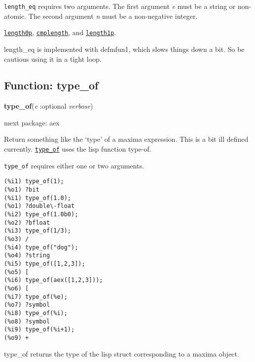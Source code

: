 \documentclass[]{article}
\begin{document}
\vspace{5 pt}

   {\tt length\_eq} requires two arguments.
    The first argument {\it e} must be a string or non-atomic.
    The second argument {\it n} must be a non-negative integer.


\vspace{5 pt}


  \hyperlink{length0p}{{\tt length0p}}, \hyperlink{cmplength}{{\tt cmplength}}, and \hyperlink{length1p}{{\tt length1p}}.

\vspace{5 pt}


length\_eq is implemented with defmfun1, which slows things down a bit. So be cautious using it in a tight loop. 

\vspace{5 pt}


\subsection{Function: type\_of\label{sec:type_of}}
\hypertarget{type_of}{}
{\bf type\_of}({\it e} :optional {\it verbose})


\noindent mext package: aex



\vspace{5 pt}
Return something like the `type' of a maxima expression. This is a bit ill defined currently. \hyperlink{type_of}{{\tt type\_of}} uses the lisp function type-of. 

\vspace{5 pt}

   {\tt type\_of} requires either one or two arguments.


\vspace{5 pt}


\begin{Verbatim}[frame=single]
(%i1) type_of(1);
(%o1) ?bit
(%i1) type_of(1.0);
(%o1) ?double\-float
(%i2) type_of(1.0b0);
(%o2) ?bfloat
(%i3) type_of(1/3);
(%o3) /
(%i4) type_of("dog");
(%o4) ?string
(%i5) type_of([1,2,3]);
(%o5) [
(%i6) type_of(aex([1,2,3]));
(%o6) [
(%i7) type_of(%e);
(%o7) ?symbol
(%i8) type_of(%i);
(%o8) ?symbol
(%i9) type_of(%i+1);
(%o9) +
\end{Verbatim}

   type\_of returns the type of the lisp struct corresponding to a maxima 
   object. 
\end{document}
